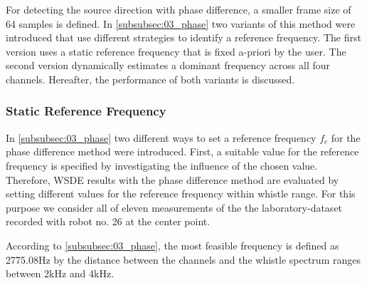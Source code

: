 For detecting the source direction with phase difference, a smaller frame
size of 64 samples is defined.
In \cref{subsubsec:03_phase} two variants of this method were introduced that use
different strategies to identify a reference frequency. The first version uses
a static reference frequency that is fixed a-priori by the user. The second version
dynamically estimates a dominant frequency across all four channels. Hereafter,
the performance of both variants is discussed.


\subsubsection*{Static Reference Frequency}

In \cref{subsubsec:03_phase} two different ways to set a reference frequency $f_c$
for the phase difference method were introduced.
First, a suitable value for the reference frequency is specified by
investigating the influence of the chosen value.
Therefore, \ac{WSDE} results with the phase difference method are evaluated by setting
different values for the reference frequency within whistle range.
For this purpose we consider all of eleven measurements of the the laboratory-dataset
recorded with robot no. 26 at the center point.

According to \cref{subsubsec:03_phase}, the most feasible frequency is defined as
2775.08\si{\hertz} by the distance between the channels
and the whistle spectrum ranges between 2\si{\kilo\hertz}
and 4\si{\kilo\hertz}.

